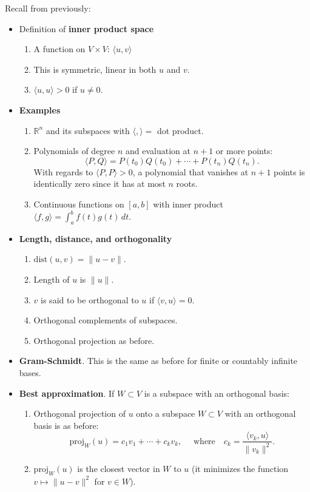 \documentclass[12pt,letterpaper]{article}
\begin{document}
\thispagestyle{fancy}

Recall from previously:

\begin{itemize}
\item[(a)] Definition of \textbf{inner product space}
\begin{enumerate}
    \item A function on $V \times V$: $\langle u, v \rangle$
    \item This is symmetric, linear in both $u$ and $v$.
    \item $\langle u, u \rangle > 0$ if $u \neq 0$.
\end{enumerate}

\item[(b)] \textbf{Examples}
\begin{enumerate}
    \item $\mathbb{R}^n$ and its subspaces with $\langle , \rangle = $ dot product.
    \item Polynomials of degree $n$ and evaluation at $n+1$ or more points:
    \[
    \langle P, Q \rangle = P(t_0)Q(t_0) + \cdots + P(t_n)Q(t_n).
    \]
    With regards to $\langle P, P \rangle > 0$, a polynomial that vanishes at $n+1$ points is identically zero since it has at most $n$ roots.
    \item Continuous functions on $[a, b]$ with inner product
    $
    \langle f, g \rangle = \int_a^b f(t)g(t) \, dt.
    $
\end{enumerate}

\item[(c)] \textbf{Length, distance, and orthogonality}
\begin{enumerate}
    \item $\text{dist}(u, v) = \|u - v\|.$
    \item Length of $u$ is $\|u\|.$
    \item $v$ is said to be orthogonal to $u$ if $\langle v,u \rangle = 0.$
    \item Orthogonal complements of subspaces.
    \item Orthogonal projection as before.
\end{enumerate}

\item[(d)] \textbf{Gram-Schmidt}.
This is the same as before for finite or countably infinite bases.

\item[(e)] \textbf{Best approximation}.
If $W \subset V$ is a subspace with an orthogonal basis:
\begin{enumerate}
    \item Orthogonal projection of $u$ onto a subspace $W \subset V$ with an orthogonal basis is as before:
    \[
    \text{proj}_W(u) = c_1v_1 + \cdots + c_kv_k,    
    \quad \mbox{ where} \quad c_k = \frac{\langle v_k,u \rangle}{\|v_k\|^2}.\]
    \item $\text{proj}_W(u)$ is the closest vector in $W$ to $u$ (it minimizes the function $v \mapsto \|u - v\|^2$ for $v \in W$).
\end{enumerate}


\end{itemize}
\end{document}
